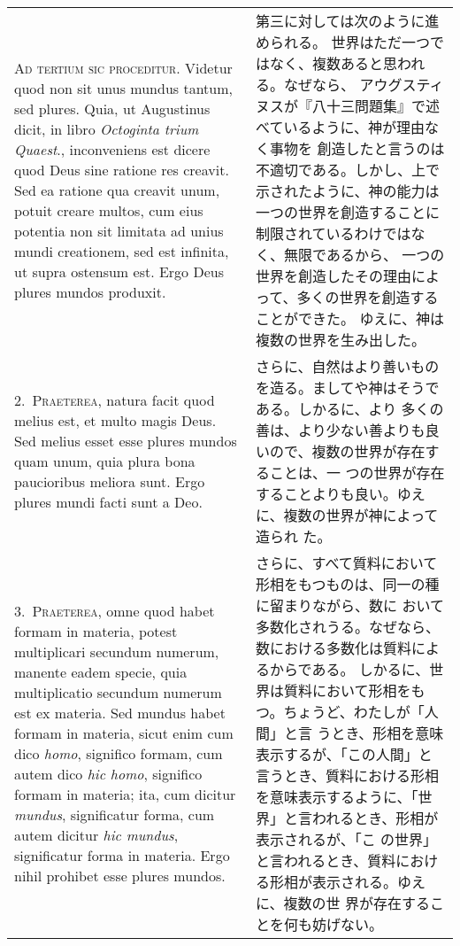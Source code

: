 \documentclass[10pt]{jsarticle} %
\begin{document}
\begin{longtable}{p{21em}p{21em}}


{\scshape Ad tertium sic proceditur}. Videtur quod non sit unus mundus
tantum, sed plures. Quia, ut Augustinus dicit, in libro {\itshape
Octoginta trium Quaest}., inconveniens est dicere quod Deus sine ratione
res creavit. Sed ea ratione qua creavit unum, potuit creare multos, cum
eius potentia non sit limitata ad unius mundi creationem, sed est
infinita, ut supra ostensum est. Ergo Deus plures mundos produxit.

&
第三に対しては次のように進められる。
世界はただ一つではなく、複数あると思われる。なぜなら、
アウグスティヌスが『八十三問題集』で述べているように、神が理由なく事物を
 創造したと言うのは不適切である。しかし、上で示されたように、神の能力は
 一つの世界を創造することに制限されているわけではなく、無限であるから、
 一つの世界を創造したその理由によって、多くの世界を創造することができた。
ゆえに、神は複数の世界を生み出した。

\\


2.~{\scshape Praeterea}, natura facit quod melius est, et
multo magis Deus. Sed melius esset esse plures mundos quam unum, quia
plura bona paucioribus meliora sunt. Ergo plures mundi facti sunt a Deo.

&

さらに、自然はより善いものを造る。ましてや神はそうである。しかるに、より
 多くの善は、より少ない善よりも良いので、複数の世界が存在することは、一
 つの世界が存在することよりも良い。ゆえに、複数の世界が神によって造られ
 た。

\\


3.~{\scshape Praeterea}, omne quod habet formam in materia, potest
multiplicari secundum numerum, manente eadem specie, quia multiplicatio
secundum numerum est ex materia. Sed mundus habet formam in materia,
sicut enim cum dico {\itshape homo}, significo formam, cum autem dico
{\itshape hic homo}, significo formam in materia; ita, cum dicitur
{\itshape mundus}, significatur forma, cum autem dicitur {\itshape hic
mundus}, significatur forma in materia. Ergo nihil prohibet esse plures
mundos.  &

さらに、すべて質料において形相をもつものは、同一の種に留まりながら、数に
 おいて多数化されうる。なぜなら、数における多数化は質料によるからである。
 しかるに、世界は質料において形相をもつ。ちょうど、わたしが「人間」と言
 うとき、形相を意味表示するが、「この人間」と言うとき、質料における形相
 を意味表示するように、「世界」と言われるとき、形相が表示されるが、「こ
 の世界」と言われるとき、質料における形相が表示される。ゆえに、複数の世
 界が存在することを何も妨げない。 


\end{longtable}
\end{document}
